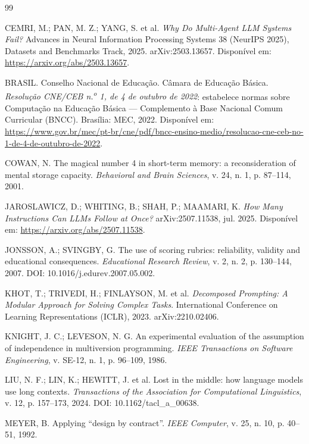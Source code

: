 \documentclass[11pt,a4paper]{article}
\begin{document}
\begin{thebibliography}{99}

CEMRI, M.; PAN, M. Z.; YANG, S. et al.
\textit{Why Do Multi-Agent LLM Systems Fail?}
Advances in Neural Information Processing Systems 38 (NeurIPS 2025), Datasets and Benchmarks Track, 2025.
arXiv:2503.13657. Disponível em: \url{https://arxiv.org/abs/2503.13657}.

BRASIL. Conselho Nacional de Educação. Câmara de Educação Básica.
\textit{Resolução CNE/CEB n.\textsuperscript{o} 1, de 4 de outubro de 2022}: estabelece normas sobre
Computação na Educação Básica --- Complemento à Base Nacional Comum Curricular (BNCC).
Brasília: MEC, 2022. Disponível em:
\url{https://www.gov.br/mec/pt-br/cne/pdf/bncc-ensino-medio/resolucao-cne-ceb-no-1-de-4-de-outubro-de-2022}.

COWAN, N. The magical number 4 in short-term memory: a reconsideration of mental storage capacity.
\textit{Behavioral and Brain Sciences}, v. 24, n. 1, p. 87--114, 2001.

JAROSLAWICZ, D.; WHITING, B.; SHAH, P.; MAAMARI, K.
\textit{How Many Instructions Can LLMs Follow at Once?}
arXiv:2507.11538, jul. 2025. Disponível em: \url{https://arxiv.org/abs/2507.11538}.

JONSSON, A.; SVINGBY, G. The use of scoring rubrics: reliability, validity and educational consequences.
\textit{Educational Research Review}, v. 2, n. 2, p. 130--144, 2007. DOI: 10.1016/j.edurev.2007.05.002.

KHOT, T.; TRIVEDI, H.; FINLAYSON, M. et al.
\textit{Decomposed Prompting: A Modular Approach for Solving Complex Tasks}.
International Conference on Learning Representations (ICLR), 2023. arXiv:2210.02406.

KNIGHT, J. C.; LEVESON, N. G. An experimental evaluation of the assumption of independence in multiversion
programming. \textit{IEEE Transactions on Software Engineering}, v. SE-12, n. 1, p. 96--109, 1986.

LIU, N. F.; LIN, K.; HEWITT, J. et al. Lost in the middle: how language models use long contexts.
\textit{Transactions of the Association for Computational Linguistics}, v. 12, p. 157--173, 2024.
DOI: 10.1162/tacl\_a\_00638.

MEYER, B. Applying ``design by contract''. \textit{IEEE Computer}, v. 25, n. 10, p. 40--51, 1992.


\end{thebibliography}
\end{document}
